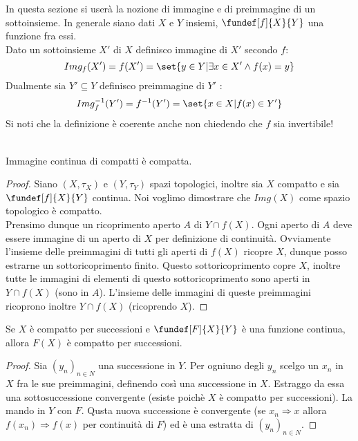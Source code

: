 

In questa sezione si userà la nozione di immagine e di preimmagine di un sottoinsieme. In generale siano dati $X$ e $Y$ insiemi, $\fundef[f]{X}{Y}$ una funzione fra essi.\\
Dato un sottoinsieme $X'$ di $X$ definisco immagine di $X'$ secondo $f$: 
\begin{equation}
Img_f(X') = f(X') =\set{y \in Y | \exists x \in X' \wedge f(x) = y} 
\end{equation}
Dualmente sia $Y'\subseteq Y$ definisco preimmagine di $Y'$ :
\begin{equation}
Img_f^{-1}(Y')=f^{-1}(Y')=\set{x\in X | f(x)\in Y'}
\end{equation}
Si noti che la definizione è coerente anche non chiedendo che $f$ sia invertibile!
\\
\\
\begin{lemma}
Immagine continua di compatti è compatta.
\end{lemma}

\begin{proof}
Siano $(X, \tau_X)$ e $(Y, \tau_Y)$ spazi topologici, inoltre sia $X$ compatto e sia $\fundef[f]{X}{Y}$ continua. Noi voglimo dimostrare che $Img(X)$ come spazio topologico è compatto.\\ 
Prensimo dunque un ricoprimento aperto $A$ di $Y\cap f(X)$. Ogni aperto di $A$ deve essere immagine di un aperto di $X$ per definizione di continuità. Ovviamente l'insieme delle preimmagini di tutti gli aperti di $f(X)$ ricopre $X$, dunque posso estrarne un sottoricoprimento finito. Questo sottoricoprimento copre $X$, inoltre tutte le immagini di elementi di questo sottoricoprimento sono aperti in $Y\cap f(X)$ (sono in $A$). L'insieme delle immagini di queste preimmagini ricoprono inoltre $Y\cap f(X)$ (ricoprendo $X$).
\end{proof}

\begin{lemma}
Se $X$ è compatto per successioni e $\fundef[F]{X}{Y}$ è una funzione continua, allora $F(X)$ è compatto per successioni.
\end{lemma}
\begin{proof}
Sia $(y_n)_{n\in N}$ una successione in $Y$. Per ogniuno degli $y_n$ scelgo un $x_n$ in $X$ fra le sue preimmagini, definendo così una successione in $X$. Estraggo da essa una sottosuccessione convergente (esiste poichè $X$ è compatto per successioni). La mando in $Y$ con $F$. Qusta nuova successione è convergente (se $x_n \Rightarrow x$ allora $f(x_n)\Rightarrow f(x)$ per continuità di $F$) ed è una estratta di   $(y_n)_{n\in N}$.
\end{proof}

